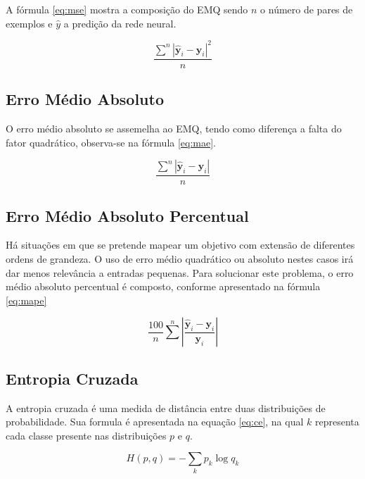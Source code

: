 A fórmula \ref{eq:mse} mostra a composição do EMQ sendo $n$ o número de pares de exemplos e $\hat{y}$ a predição da rede neural.

\begin{equation} \label{eq:mse}
    \frac{\displaystyle\sum^n |\hat{\mathbf{y}}_i - \mathbf{y}_i|^2}{n}
\end{equation}

\subsection{Erro Médio Absoluto}

O erro médio absoluto se assemelha ao EMQ, tendo como diferença a falta do fator quadrático, observa-se na fórmula \ref{eq:mae}.

\begin{equation} \label{eq:mae}
    \frac{\displaystyle\sum^n |\hat{\mathbf{y}}_i - \mathbf{y}_i|}{n}
\end{equation}

\subsection{Erro Médio Absoluto Percentual}

Há situações em que se pretende mapear um objetivo com extensão de diferentes ordens de grandeza. O uso de erro médio quadrático ou absoluto nestes casos irá dar menos relevância a entradas pequenas. Para solucionar este problema, o erro médio absoluto percentual é composto, conforme apresentado na fórmula \ref{eq:mape}

\begin{equation} \label{eq:mape}
    \frac{100}{n}\sum^n \left|\frac{\hat{\mathbf{y}}_i - \mathbf{y}_i}{\mathbf{y}_i}\right|
\end{equation}

\subsection{Entropia Cruzada}

A entropia cruzada é uma medida de distância entre duas distribuições de probabilidade. Sua formula é apresentada na equação \ref{eq:ce}, na qual $k$ representa cada classe presente nas distribuições $p$ e $q$.

\begin{equation} \label{eq:ce}
    H(p, q) = -\sum_k p_k \log q_k
\end{equation}

